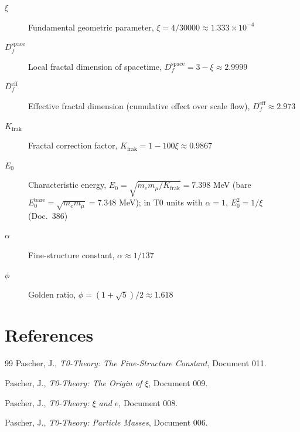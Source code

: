 	\begin{description}
		\item[$\xi$] Fundamental geometric parameter, $\xi = 4/30000 \approx 1.333 \times 10^{-4}$
		\item[$D_f^{\text{space}}$] Local fractal dimension of spacetime, $D_f^{\text{space}} = 3 - \xi \approx 2.9999$
		\item[$D_f^{\text{eff}}$] Effective fractal dimension (cumulative effect over scale flow), $D_f^{\text{eff}} \approx 2.973$
		\item[$K_{\text{frak}}$] Fractal correction factor, $K_{\text{frak}} = 1 - 100\xi \approx 0.9867$
		\item[$E_0$] Characteristic energy, $E_0 = \sqrt{m_e m_\mu/K_{\text{frak}}} = 7.398$ MeV (bare $E_0^{\text{bare}} = \sqrt{m_e m_\mu} = 7.348$ MeV); in T0 units with $\alpha = 1$, $E_0^2 = 1/\xi$ (Doc.~386)
		\item[$\alpha$] Fine-structure constant, $\alpha \approx 1/137$
		\item[$\phi$] Golden ratio, $\phi = (1+\sqrt{5})/2 \approx 1.618$
	\end{description}
	
	\section{References}
	
	\begin{thebibliography}{99}
		Pascher, J., \emph{T0-Theory: The Fine-Structure Constant}, Document 011.
		
		Pascher, J., \emph{T0-Theory: The Origin of $\xi$}, Document 009.
		
		Pascher, J., \emph{T0-Theory: $\xi$ and $e$}, Document 008.
		
		Pascher, J., \emph{T0-Theory: Particle Masses}, Document 006.
		
	\end{thebibliography}
	